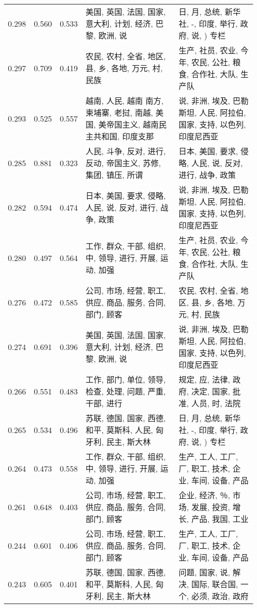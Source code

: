 \begin{tabular}{cccp{5cm}p{5cm}}
0.298 & 0.560 & 0.533 & 美国, 英国, 法国, 国家, 意大利, 计划, 经济, 巴黎, 欧洲, 说 & 日, 月, 总统, 新华社, -, 印度, 举行, 政府, 说, ) 专栏 \\
0.297 & 0.709 & 0.419 & 农民, 农村, 全省, 地区, 县, 乡, 各地, 万元, 村, 民族 & 生产, 社员, 农业, 今年, 农民, 公社, 粮食, 合作社, 大队, 生产队 \\
0.293 & 0.525 & 0.557 & 越南, 人民, 越南 南方, 柬埔寨, 老挝, 南越, 美国, 美帝国主义, 越南民主共和国, 印度支那 & 说, 非洲, 埃及, 巴勒斯坦, 人民, 阿拉伯, 国家, 支持, 以色列, 印度尼西亚 \\
0.285 & 0.881 & 0.323 & 人民, 斗争, 反对, 进行, 反动, 帝国主义, 苏修, 集团, 镇压, 所谓 & 日本, 美国, 要求, 侵略, 人民, 说, 反对, 进行, 战争, 政策 \\
0.282 & 0.594 & 0.474 & 日本, 美国, 要求, 侵略, 人民, 说, 反对, 进行, 战争, 政策 & 说, 非洲, 埃及, 巴勒斯坦, 人民, 阿拉伯, 国家, 支持, 以色列, 印度尼西亚 \\
0.280 & 0.497 & 0.564 & 工作, 群众, 干部, 组织, 中, 领导, 进行, 开展, 运动, 加强 & 生产, 社员, 农业, 今年, 农民, 公社, 粮食, 合作社, 大队, 生产队 \\
0.276 & 0.472 & 0.585 & 公司, 市场, 经营, 职工, 供应, 商品, 服务, 合同, 部门, 顾客 & 农民, 农村, 全省, 地区, 县, 乡, 各地, 万元, 村, 民族 \\
0.274 & 0.691 & 0.396 & 美国, 英国, 法国, 国家, 意大利, 计划, 经济, 巴黎, 欧洲, 说 & 说, 非洲, 埃及, 巴勒斯坦, 人民, 阿拉伯, 国家, 支持, 以色列, 印度尼西亚 \\
0.266 & 0.551 & 0.483 & 工作, 部门, 单位, 领导, 检查, 处理, 问题, 严重, 干部, 进行 & 规定, 应, 法律, 政府, 决定, 国家, 批准, 人员, 时, 法院 \\
0.265 & 0.534 & 0.496 & 苏联, 德国, 国家, 西德, 和平, 莫斯科, 人民, 匈牙利, 民主, 斯大林 & 日, 月, 总统, 新华社, -, 印度, 举行, 政府, 说, ) 专栏 \\
0.264 & 0.473 & 0.558 & 工作, 群众, 干部, 组织, 中, 领导, 进行, 开展, 运动, 加强 & 生产, 工人, 工厂, 厂, 职工, 技术, 企业, 车间, 设备, 产品 \\
0.261 & 0.648 & 0.403 & 公司, 市场, 经营, 职工, 供应, 商品, 服务, 合同, 部门, 顾客 & 企业, 经济, ％, 市场, 发展, 投资, 增长, 产品, 我国, 工业 \\
0.244 & 0.601 & 0.406 & 公司, 市场, 经营, 职工, 供应, 商品, 服务, 合同, 部门, 顾客 & 生产, 工人, 工厂, 厂, 职工, 技术, 企业, 车间, 设备, 产品 \\
0.243 & 0.605 & 0.401 & 苏联, 德国, 国家, 西德, 和平, 莫斯科, 人民, 匈牙利, 民主, 斯大林 & 问题, 国家, 说, 解决, 国际, 联合国, 一个, 必须, 政治, 政府 \\

\end{tabular}
